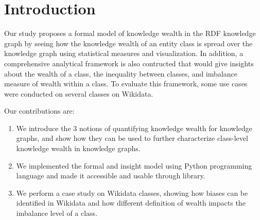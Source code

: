 \section{Introduction}


Our study proposes a formal model of knowledge wealth in the RDF knowledge graph by seeing how the knowledge wealth of an entity class is spread over the knowledge graph using statistical measures and visualization. In addition, a comprehensive analytical framework is also contructed that would give insights about the wealth of a class, the inequality between classes, and imbalance measure of wealth within a class. To evaluate this framework, some use cases were conducted on several classes on Wikidata.

Our contributions are:
\begin{enumerate}
    \item We introduce the 3 notions of quantifying knowledge wealth for knowledge graphs, and show how they can be used to further characterize class-level knowledge wealth in knowledge graphs.
    \item We implemented the formal and insight model using Python programming language and made it accessible and usable through library.
    \item We perform a case study on Wikidata classes, showing how biases can be identified in Wikidata and how different definition of wealth impacts the imbalance level of a class.
\end{enumerate}